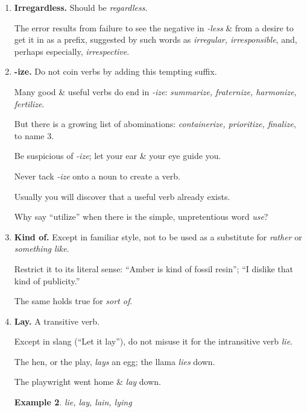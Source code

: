 \documentclass{article}
\newtheorem{example}{Example}
\begin{document}
\begin{enumerate}
	Instead of announcing that what you are about to tell is interesting, make it so.
	\begin{example}
		An interesting story is told of $\to$ (Tell the story without preamble.)
		
		In connection with the forthcoming visit of Mr. B. to America, it is interesting to recall that he
		
		$\to$ Mr. B., who will soon visit America
	\end{example}
	Also to be avoided in introduction is the word {\it funny}.
	
	Nothing becomes funny by being labeled so.
	\item {\bf Irregardless.} Should be {\it regardless}.
	
	The error results from failure to see the negative in {\it -less} \& from a desire to get it in as a prefix, suggested by such words as {\it irregular, irresponsible}, and, perhaps especially, {\it irrespective}.
	\item {\bf -ize.} Do not coin verbs by adding this tempting suffix.
	
	Many good \& useful verbs do end in {\it -ize}: {\it summarize, fraternize, harmonize, fertilize}.
	
	But there is a growing list of abominations: {\it containerize, prioritize, finalize}, to name 3.
	
	Be suspicious of {\it -ize}; let your ear \& your eye guide you.
	
	Never tack {\it -ize} onto a noun to create a verb.
	
	Usually you will discover that a useful verb already exists.
	
	Why say ``utilize'' when there is the simple, unpretentious word {\it use}?
	\item {\bf Kind of.} Except in familiar style, not to be used as a substitute for {\it rather} or {\it something like}.
	
	Restrict it to its literal sense: ``Amber is kind of fossil resin''; ``I dislike that kind of publicity.''
	
	The same holds true for {\it sort of}.
	\item {\bf Lay.} A transitive verb.
	
	Except in slang (``Let it lay''), do not misuse it for the intransitive verb {\it lie}.
	
	The hen, or the play, {\it lays} an egg; the llama {\it lies} down.
	
	The playwright went home \& {\it lay} down.
	\begin{example}
		lie, lay, lain, lying
		

\end{example}
\end{enumerate}
\end{document}
